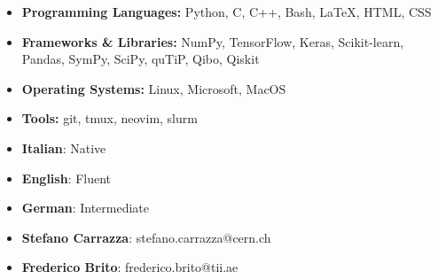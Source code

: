 \documentclass[9pt]{developercv} %
\begin{document}

\begin{itemize}[leftmargin=*, topsep=0pt]
\setlength\itemsep{0pt}
    \item \textbf{Programming Languages:} Python, C, C++, Bash, \LaTeX, HTML, CSS
    \item \textbf{Frameworks \& Libraries:} NumPy, TensorFlow, Keras, Scikit-learn, Pandas, SymPy, SciPy, quTiP, Qibo, Qiskit
    \item \textbf{Operating Systems:} Linux, Microsoft, MacOS
    \item \textbf{Tools:} git, tmux, neovim, slurm
\end{itemize}

\begin{itemize}[leftmargin=*, topsep=0pt]
\setlength\itemsep{0pt}
    \item \textbf{Italian}: Native
    \item \textbf{English}: Fluent
    \item \textbf{German}: Intermediate
\end{itemize}

\begin{itemize}[leftmargin=*, topsep=0pt]
\setlength\itemsep{0pt}
    \item \textbf{Stefano Carrazza}: stefano.carrazza@cern.ch
    \item \textbf{Frederico Brito}: frederico.brito@tii.ae
\end{itemize}
\end{document}

